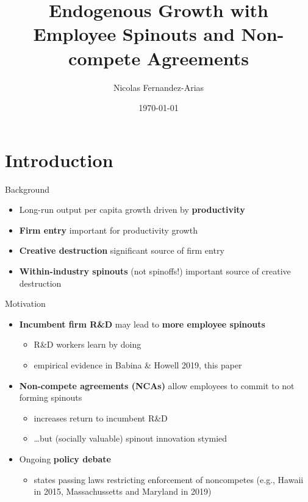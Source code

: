 \documentclass[english,usenames,dvipsnames]{beamer}
\title{Endogenous Growth with Employee Spinouts and Non-compete Agreements}
\author{Nicolas Fernandez-Arias}
\date{\today }
\begin{document}
\maketitle

\section{Introduction}

\begin{frame}{Background}\label{motivation_spillovers}
\begin{itemize}
	\item<+-> Long-run output per capita growth driven by \alert{\textbf{productivity}} \hyperlink{economic_growth_facts}{}
	\smallskip
	\item<+-> \alert{\textbf{Firm entry}} important for productivity growth \hyperlink{motivation:importance_of_firm_entry}{}
	\smallskip
	\item<+-> \alert{\textbf{Creative destruction}} significant source of firm entry \hyperlink{motivation:importance_of_creative_destruction}{}
	\item<+-> \alert{\textbf{Within-industry spinouts}} (not spinoffs!) important source of creative destruction  \hyperlink{spinouts_facts_from_literature}{} 	\hyperlink{fairchildren_early}{}
\end{itemize}
\end{frame}

\begin{frame}{Motivation}\label{motivation}
\begin{itemize}
	\item<+-> \alert{\textbf{Incumbent firm R\&D}} may lead to \alert{\textbf{more employee spinouts}}
	\begin{itemize}
		\item R\&D workers learn by doing 
		\item empirical evidence in Babina \& Howell 2019, this paper
	\end{itemize}
	\smallskip
	\item<+-> \alert{\textbf{Non-compete agreements (NCAs)}} allow employees to commit to not forming spinouts
	\begin{itemize}
		\item<+-> increases return to incumbent R\&D
		\item<+-> \ldots but (socially valuable) spinout innovation stymied
	\end{itemize}
	\smallskip
	\item<+-> Ongoing \alert{\textbf{policy debate}}
	\begin{itemize}
		\item states passing laws restricting enforcement of noncompetes (e.g., Hawaii in 2015, Massachussetts and Maryland in 2019) 
	\end{itemize}
\end{itemize}
\end{frame}
\end{document}
